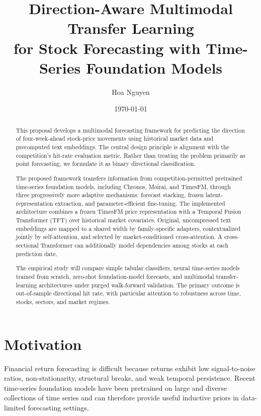 \documentclass[11pt]{article}
\title{
\textbf{Direction-Aware Multimodal Transfer Learning\\
for Stock Forecasting with Time-Series Foundation Models}
}
\author{
Hoa Nguyen
}
\date{\today}
\begin{document}
\maketitle

\begin{abstract}
This proposal develops a multimodal forecasting framework for predicting the
direction of four-week-ahead stock-price movements using historical market
data and precomputed text embeddings. The central design principle is alignment
with the competition's hit-rate evaluation metric. Rather than treating the
problem primarily as point forecasting, we formulate it as binary directional
classification.

The proposed framework transfers information from competition-permitted
pretrained time-series foundation models, including Chronos, Moirai, and
TimesFM, through three progressively more adaptive mechanisms: forecast
stacking, frozen latent-representation extraction, and parameter-efficient
fine-tuning. The implemented architecture combines a frozen TimesFM price
representation with a Temporal Fusion Transformer (TFT) over historical
market covariates. Original, uncompressed text embeddings are mapped to a
shared width by family-specific adapters, contextualized jointly by
self-attention, and selected by market-conditioned cross-attention. A
cross-sectional Transformer can additionally model dependencies among stocks
at each prediction date.

The empirical study will compare simple tabular classifiers, neural
time-series models trained from scratch, zero-shot foundation-model forecasts,
and multimodal transfer-learning architectures under purged walk-forward
validation. The primary outcome is out-of-sample directional hit rate, with
particular attention to robustness across time, stocks, sectors, and market
regimes.
\end{abstract}

\section{Motivation}

Financial return forecasting is difficult because returns exhibit low
signal-to-noise ratios, non-stationarity, structural breaks, and weak temporal
persistence. Recent time-series foundation models have been pretrained on
large and diverse collections of time series and can therefore provide useful
inductive priors in data-limited forecasting settings.
\end{document}
